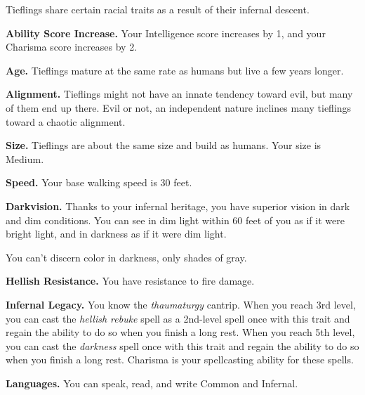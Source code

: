 Tieflings share certain racial traits as a result of their infernal
descent.

\textbf{Ability Score Increase.} Your Intelligence score increases by 1,
and your Charisma score increases by 2.

\textbf{Age.} Tieflings mature at the same rate as humans but live a few
years longer.

\textbf{Alignment.} Tieflings might not have an innate tendency toward
evil, but many of them end up there. Evil or not, an independent nature
inclines many tieflings toward a chaotic alignment.

\textbf{Size.} Tieflings are about the same size and build as humans.
Your size is Medium.

\textbf{Speed.} Your base walking speed is 30 feet.

\textbf{Darkvision.} Thanks to your infernal heritage, you have superior
vision in dark and dim conditions. You can see in dim light within 60
feet of you as if it were bright light, and in darkness as if it were
dim light.

You can't discern color in darkness, only shades of gray.

\textbf{Hellish Resistance.} You have resistance to fire damage.

\textbf{Infernal Legacy.} You know the \emph{thaumaturgy} cantrip. When
you reach 3rd level, you can cast the \emph{hellish rebuke} spell as a
2nd-level spell once with this trait and regain the ability to do so
when you finish a long rest. When you reach 5th level, you can cast the
\emph{darkness} spell once with this trait and regain the ability to do
so when you finish a long rest. Charisma is your spellcasting ability
for these spells.

\textbf{Languages.} You can speak, read, and write Common and Infernal.
